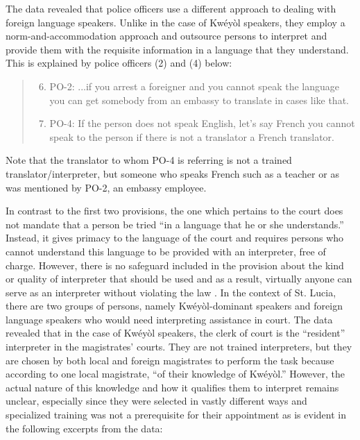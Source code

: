 \documentclass[output=paper,colorlinks,citecolor=brown]{langscibook}
\begin{document}
The data revealed that police officers use a different approach to dealing with foreign language speakers. Unlike in the case of Kwéyòl speakers, they employ a norm-and-accommodation approach and outsource persons to interpret and provide them with the requisite information in a language that they understand. This is explained by police officers (2) and (4) below: 

\begin{quote}
    \begin{enumerate}
    \setcounter{enumi}{5}    
        \item PO-2: ...if you arrest a foreigner and you cannot speak the language you can get somebody from an embassy to translate in cases like that.

        \item PO-4: If the person does not speak English, let’s say French you cannot speak to the person if there is not a translator a French translator.
    \end{enumerate}
\end{quote}

Note that the translator to whom PO-4 is referring is not a trained translator/interpreter, but someone who speaks French such as a teacher \citep{Evans2019} or as was mentioned by PO-2, an embassy employee.

In contrast to the first two provisions, the one which pertains to the court does not mandate that a person be tried “in a language that he or she understands.” Instead, it gives primacy to the language of the court and requires persons who cannot understand this language to be provided with an interpreter, free of charge. However, there is no safeguard included in the provision about the kind or quality of interpreter that should be used and as a result, virtually anyone can serve as an interpreter without violating the law \citep{BerkSeligson2000,Berk-Seligson2002,HerraezJuanFoulquie2008}. In the context of St. Lucia, there are two groups of persons, namely Kwéyòl-dominant speakers and foreign language speakers who would need interpreting assistance in court. The data revealed that in the case of Kwéyòl speakers, the clerk of court is the “resident” interpreter \citep{Evans2012} in the magistrates’ courts. They are not trained interpreters, but they are chosen by both local and foreign magistrates to perform the task because according to one local magistrate, “of their knowledge of Kwéyòl.” However, the actual nature of this knowledge and how it qualifies them to interpret remains unclear, especially since they were selected in vastly different ways and specialized training was not a prerequisite for their appointment as is evident in the following excerpts from the data:
\end{document}
